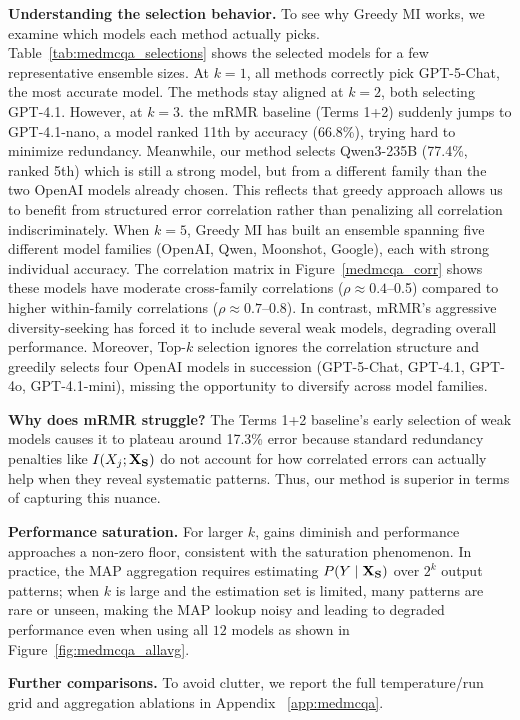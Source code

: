 \documentclass{article}
\theoremstyle{plain}
\theoremstyle{definition}
\theoremstyle{remark}
\begin{document}
\textbf{Understanding the selection behavior.} To see why Greedy MI works, we examine which models each method actually picks. Table~\ref{tab:medmcqa_selections} shows the selected models for a few representative ensemble sizes. At $k=1$, all methods correctly pick GPT-5-Chat, the most accurate model. The methods stay aligned at $k=2$, both selecting GPT-4.1. However, at $k=3$. the mRMR baseline (Terms 1+2) suddenly jumps to GPT-4.1-nano, a model ranked 11th by accuracy (66.8\%), trying hard to minimize redundancy. Meanwhile, our method selects Qwen3-235B (77.4\%, ranked 5th) which is still a strong model, but from a different family than the two OpenAI models already chosen. This reflects that greedy approach allows us to benefit from structured error correlation rather than penalizing all correlation indiscriminately. When $k=5$, Greedy MI has built an ensemble spanning five different model families (OpenAI, Qwen, Moonshot, Google), each with strong individual accuracy. The correlation matrix in Figure~\ref{medmcqa_corr} shows these models have moderate cross-family correlations ($\rho \approx 0.4$--0.5) compared to higher within-family correlations ($\rho \approx 0.7$--0.8). In contrast, mRMR's aggressive diversity-seeking has forced it to include several weak models, degrading overall performance. Moreover, Top-$k$ selection ignores the correlation structure and greedily selects four OpenAI models in succession (GPT-5-Chat, GPT-4.1, GPT-4o, GPT-4.1-mini), missing the opportunity to diversify across model families.


\textbf{Why does mRMR struggle?} The Terms 1+2 baseline's early selection of weak models causes it to plateau around 17.3\% error because standard redundancy penalties like $I(X_j; {\bf X_S})$ do not account for how correlated errors can actually help when they reveal systematic patterns. Thus, our method is superior in terms of capturing this nuance.

\textbf{Performance saturation.} For larger $k$, gains diminish and performance approaches a non-zero floor, consistent with the saturation phenomenon. In practice, the MAP aggregation requires estimating $P(Y\mid \bf{X_S})$ over $2^k$ output patterns; when $k$ is large and the estimation set is limited, many patterns are rare or unseen, making the MAP lookup noisy and leading to degraded performance even when using all $12$ models as shown in Figure~\ref{fig:medmcqa_allavg}.


\textbf{Further comparisons.} To avoid clutter, we report the full temperature/run grid and aggregation ablations in Appendix~ \ref{app:medmcqa}. 
\end{document}
